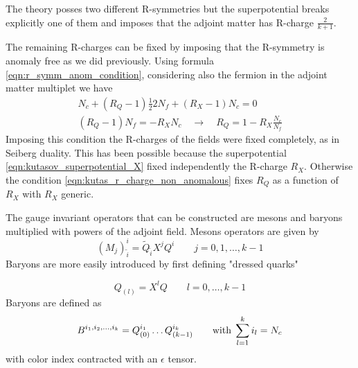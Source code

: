 The theory posses two different R-symmetries but the superpotential breaks explicitly one of them and imposes that the adjoint matter has R-charge $\frac{2}{k+1}$.

The remaining R-charges can be fixed by imposing that the R-symmetry is anomaly free as we did previously.
Using formula \eqref{eqn:r_symm_anom_condition}, considering also the fermion in the adjoint matter multiplet we have
\begin{equation}
\begin{aligned}
N_c + (R_Q -1) \frac{1}{2} 2 N_f + (R_X - 1 ) N_c = 0 
\label{eqn:kutas_r_charge_non_anomalous}
\\
(R_Q - 1 ) N_f = - R_X N_c \quad \longrightarrow \quad R_Q = 1 - R_X \frac{N_c}{N_f}
\end{aligned}
\end{equation}
Imposing this condition the R-charges of the fields were fixed completely, as in Seiberg duality.
This has been possible because the superpotential 
\eqref{eqn:kutasov_superpotential_X}
fixed independently the R-charge $R_X$.
Otherwise the condition \eqref{eqn:kutas_r_charge_non_anomalous} fixes $R_Q$ as a function of $R_X$ with $R_X$ generic.
\\
\begin{comment}
It is interesting to note that the condition \eqref{eqn:kutas_r_charge_non_anomalous} can be found independently by requiring that the $\beta$ function has a fixed point
\begin{align}
0 =\beta{g} \sim & 3 T(Adj) - \sum_i T(Repr_i) (1- \gamma_i) = \\
 = & \,  T(Adj) + \sum_i T(Repr_i) ( R_i -1) = 0
\end{align}
where we have used $\gamma_i + 2 = 2 D_i \;$ for chiral fields and $ \; R_i = \frac{3}{2} D_i$ for chiral fields at the superconformal fixed point.
\\
\end{comment}

The gauge invariant operators that can be constructed are mesons and baryons multiplied with powers of the adjoint field.
Mesons operators are given by
\begin{equation}
 (M_j)^i_{\tilde{i}} = \tilde{Q}_{\tilde{i}} X^{j} Q^i \qquad j = 0,1,\dotsc,k-1
\end{equation}
Baryons are more easily introduced by first defining "dressed quarks"

\begin{equation}
 Q_{(l)} = X^{l} Q \qquad l =0, \dotsc, k-1
\end{equation}
Baryons are defined as
\begin{equation}
B^{i_1, i_2, \dotsc , i_k} = Q_{(0)}^{i_1} \dots Q_{(k-1)}^{i_k} \qquad \hbox{with} \; \sum_{l=1}^k i_l = N_c 
\end{equation}
with color index contracted with an $\epsilon$ tensor.


